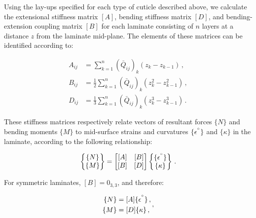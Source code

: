 \documentclass[twocolumn, linenumbers, superscriptaddress, nofootinbib]{revtex4-1}
\begin{document}
				Using the lay-ups specified for each type of cuticle described above, we calculate the extensional stiffness matrix $[A]$, bending stiffness matrix $[D]$, and bending-extension coupling matrix $[B]$ for each laminate consisting of $n$ layers at a distance $z$ from the laminate mid-plane.
				The elements of these matrices can be identified according to:
				
				\begin{equation}
					\begin{aligned}
						A_{ij} & = \sum_{k = 1}^{n}(\bar{Q}_{ij})_k(z_{k} - z_{k-1})\,, \\
						B_{ij} & = \frac{1}{2}\sum_{k = 1}^{n}(\bar{Q}_{ij})_k(z^2_{k} - z^2_{k-1})\,, \\
						D_{ij} & = \frac{1}{3}\sum_{k = 1}^{n}(\bar{Q}_{ij})_k(z^3_{k} - z^3_{k-1})\,.
					\end{aligned}
				\end{equation}
				
				These stiffness matrices respectively relate vectors of resultant forces $\{N\}$ and bending moments $\{M\}$ to mid-surface strains and curvatures $\{\epsilon^{\degree}\}$ and $\{\kappa\}$ in the laminate, according to the following relationship:
				
				\begin{equation}
					\begin{Bmatrix}
						\{N\} \\
						\{M\}
					\end{Bmatrix}
					=
					\begin{bmatrix}
						[A] & [B] \\
						[B] & [D]
					\end{bmatrix}
					\begin{Bmatrix}
					\{\epsilon^{\degree}\} \\
					\{\kappa\}
					\end{Bmatrix}\,.
				\end{equation}
				
				For symmetric laminates, $[B] = 0_{3,3}$, and therefore:
				
				\begin{equation}
				\label{eqn::abbd}
					\begin{aligned}
						\{N\} & = [A]\{\epsilon^{\degree}\}\,, \\
						\{M\} & = [D]\{\kappa\}\,,						
					\end{aligned}\,,
				\end{equation}
				
\end{document}
